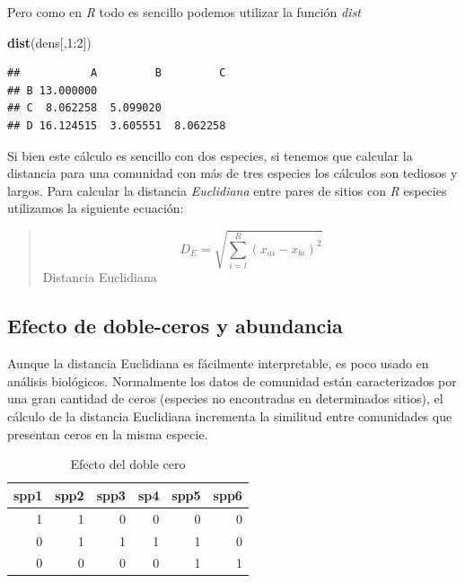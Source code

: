 \documentclass[]{book}
\newenvironment{Shaded}{\begin{snugshade}}{\end{snugshade}}
\newcommand{\KeywordTok}[1]{\textcolor[rgb]{0.13,0.29,0.53}{\textbf{{#1}}}}
\newcommand{\DecValTok}[1]{\textcolor[rgb]{0.00,0.00,0.81}{{#1}}}
\newcommand{\NormalTok}[1]{{#1}}
\begin{document}
Pero como en \emph{R} todo es sencillo podemos utilizar la función
\emph{dist}

\begin{Shaded}
\begin{Highlighting}[]
\KeywordTok{dist}\NormalTok{(dens[,}\DecValTok{1}\NormalTok{:}\DecValTok{2}\NormalTok{])}
\end{Highlighting}
\end{Shaded}

\begin{verbatim}
##           A         B         C
## B 13.000000                    
## C  8.062258  5.099020          
## D 16.124515  3.605551  8.062258
\end{verbatim}

Si bien este cálculo es sencillo con dos especies, si tenemos que
calcular la distancia para una comunidad con más de tres especies los
cálculos son tediosos y largos. Para calcular la distancia
\emph{Euclidiana} entre pares de sitios con \emph{R} especies utilizamos
la siguiente ecuación:

\begin{quote}
\[D_E = \sqrt{\sum_{i=l}^R (x_{ai} - x_{bi})^2}\] Distancia Euclidiana
\end{quote}

\subsection{Efecto de doble-ceros y
abundancia}\label{efecto-de-doble-ceros-y-abundancia}

Aunque la distancia Euclidiana es fácilmente interpretable, es poco
usado en análisis biológicos. Normalmente los datos de comunidad están
caracterizados por una gran cantidad de ceros (especies no encontradas
en determinados sitios), el cálculo de la distancia Euclidiana
incrementa la similitud entre comunidades que presentan ceros en la
misma especie.

\begin{table}

\caption{\label{tab:unnamed-chunk-9}Efecto del doble cero}
\centering
\begin{tabular}[t]{r|r|r|r|r|r}
\hline
spp1 & spp2 & spp3 & sp4 & spp5 & spp6\\
\hline
1 & 1 & 0 & 0 & 0 & 0\\
\hline
0 & 1 & 1 & 1 & 1 & 0\\
\hline
0 & 0 & 0 & 0 & 1 & 1\\
\hline
\end{tabular}
\end{table}
\end{document}
